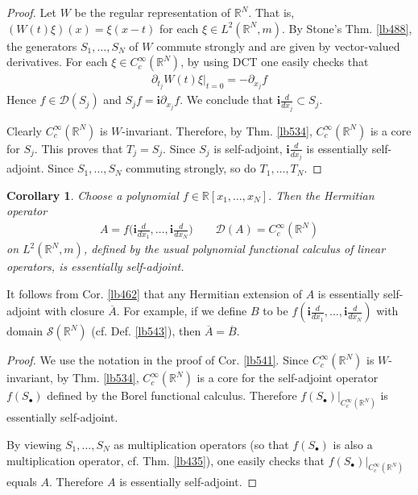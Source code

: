 \documentclass[12pt,b5paper,notitlepage]{article}
\theoremstyle{definition}
\theoremstyle{plain}
\newtheorem{co}[df]{Corollary}
\newcommand{\ovl}{\overline}
\newcommand{\Dom}{\mathscr{D}}
\newcommand{\im}{\mathbf{i}}
\newcommand{\blt}{\bullet}
\newcommand{\Rbb}{\mathbb R}
\newcommand{\MS}{\mathcal S}
\numberwithin{equation}{section}
\begin{document}
\begin{proof}
Let $W$ be the regular representation of $\Rbb^N$. That is, $(W(t)\xi)(x)=\xi(x-t)$ for each $\xi\in L^2(\Rbb^N,m)$. By Stone's Thm. \ref{lb488}, the generators $S_1,\dots,S_N$ of $W$ commute strongly and are given by vector-valued derivatives. For each $\xi\in C_c^\infty(\Rbb^N)$, by using DCT one easily checks that
\begin{align*}
\partial_{t_j}W(t)\xi\big|_{t=0}=-\partial_{x_j}f
\end{align*}
Hence $f\in\Dom(S_j)$ and $S_jf=\im\partial_{x_j}f$. We conclude that $\im\frac d{dx_j}\subset S_j$. 

Clearly $C_c^\infty(\Rbb^N)$ is $W$-invariant. Therefore, by Thm. \ref{lb534}, $C_c^\infty(\Rbb^N)$ is a core for $S_j$. This proves that $T_j=S_j$. Since $S_j$ is self-adjoint, $\im\frac d{dx_j}$ is essentially self-adjoint. Since $S_1,\dots,S_N$ commuting strongly, so do $T_1,\dots,T_N$.
\end{proof}

\begin{co}\label{lb542}
Choose a polynomial $f\in\Rbb[x_1,\dots,x_N]$. Then the Hermitian operator 
\begin{align*}
A=f\Big(\im\frac d{dx_1},\dots,\im\frac d{dx_N}\Big)\qquad\Dom(A)=C_c^\infty(\Rbb^N)
\end{align*}
on $L^2(\Rbb^N,m)$, defined by the usual polynomial functional calculus of linear operators, is essentially self-adjoint.
\end{co}

It follows from Cor. \ref{lb462} that any Hermitian extension of $A$ is essentially self-adjoint with closure $\ovl A$. For example, if we define $B$ to be $f(\im\frac d{dx_1},\dots,\im\frac d{dx_N})$ with domain $\MS(\Rbb^N)$ (cf. Def. \ref{lb543}), then $\ovl A=\ovl B$.

\begin{proof}
We use the notation in the proof of Cor. \ref{lb541}. Since $C_c^\infty(\Rbb^N)$ is $W$-invariant, by Thm. \ref{lb534}, $C_c^\infty(\Rbb^N)$ is a core for the self-adjoint operator $f(S_\blt)$ defined by the Borel functional calculus. Therefore $f(S_\blt)|_{C_c^\infty(\Rbb^N)}$ is essentially self-adjoint.

By viewing $S_1,\dots,S_N$ as multiplication operators (so that $f(S_\blt)$ is also a multiplication operator, cf. Thm. \ref{lb435}), one easily checks that $f(S_\blt)|_{C_c^\infty(\Rbb^N)}$ equals $A$. Therefore $A$ is essentially self-adjoint.
\end{proof}
\end{document}
